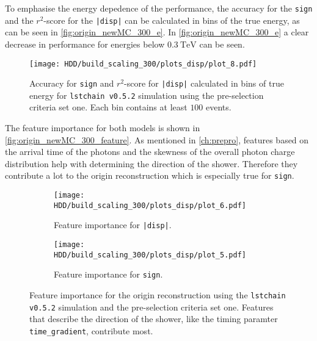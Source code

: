 To emphasise the energy depedence of the performance, the accuracy for the \texttt{sign} and the $r^2$-score for the \texttt{|disp|} can
be calculated in bins of the true energy, as can be seen in \autoref{fig:origin_newMC_300_e}.
In \autoref{fig:origin_newMC_300_e} a clear decrease in performance for energies below $\SI{0.3}{\tera\electronvolt}$ can be seen.
\begin{figure}
    \centering
    \texttt{[image: HDD/build\_scaling\_300/plots\_disp/plot\_8.pdf]}
    \caption{Accuracy for \texttt{sign} and $r^2$-score for \texttt{|disp|} calculated in bins of true energy for 
        \texttt{lstchain v0.5.2} simulation using the pre-selection criteria set one.
        Each bin contains at least $\num{100}$ events.
    }
    \label{fig:origin_newMC_300_e}
\end{figure}

The feature importance for both models is shown in \autoref{fig:origin_newMC_300_feature}.
As mentioned in \autoref{ch:prepro}, features based on the arrival time of the photons and the skewness of the overall photon charge distribution
help with determining the direction of the shower.
Therefore they contribute a lot to the origin reconstruction which is especially true for \texttt{sign}.
\begin{figure}
    \centering
    \begin{subfigure}{0.49\textwidth}
        \centering
        \texttt{[image: HDD/build\_scaling\_300/plots\_disp/plot\_6.pdf]}
        \caption{Feature importance for \texttt{|disp|}.}
    \end{subfigure}
    \hfill
    \begin{subfigure}{0.49\textwidth}
        \centering
        \texttt{[image: HDD/build\_scaling\_300/plots\_disp/plot\_5.pdf]}
        \caption{Feature importance for \texttt{sign}.}
    \end{subfigure}
    \caption{Feature importance for the origin reconstruction using the \texttt{lstchain v0.5.2} simulation and the pre-selection criteria set one.
        Features that describe the direction of the shower, like the timing paramter \texttt{time\_gradient}, contribute most.
    }
    \label{fig:origin_newMC_300_feature}
\end{figure}


